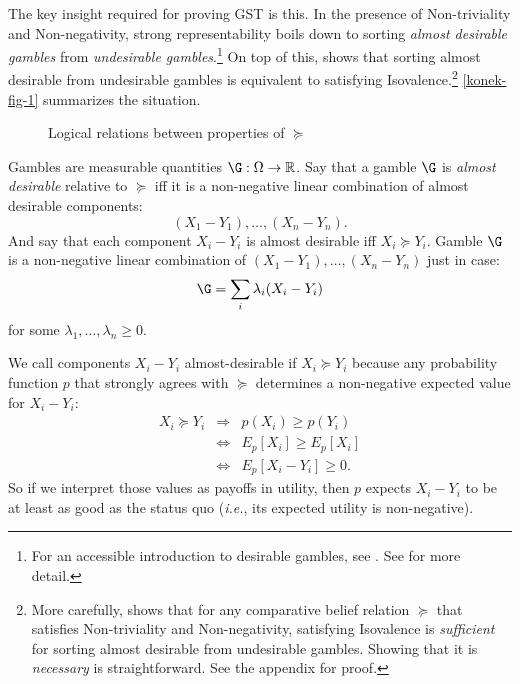 The key insight required for proving GST is this. In the presence of Non-triviality and Non-negativity, strong representability boils down to sorting \textit{almost desirable gambles} from \textit{undesirable gambles}.\footnote{For an accessible introduction to desirable gambles, see \citet{Walley2000}. See \citet{Quaeghebeur2014} for more detail.} On top of this, \citet{Scott1964} shows that sorting almost desirable from undesirable gambles is equivalent to satisfying Isovalence.\footnote{More carefully, \citet{Scott1964} shows that for any comparative belief relation $\succeq$ that satisfies Non-triviality and Non-negativity, satisfying Isovalence is \textit{sufficient} for sorting almost desirable from undesirable gambles. Showing that it is \textit{necessary} is straightforward. See the appendix for proof.} \autoref{konek-fig-1} summarizes the situation.
\begin{figure}[ht]
\centering
\vspace*{3mm}
\caption{Logical relations between properties of $\succeq$}\label{konek-fig-1}
\end{figure}

Gambles are measurable quantities $\G:\Omega\rightarrow\mathbb{R}$. Say that a gamble $\G$ is \textit{almost desirable} relative to $\succeq$ iff it is a non-negative linear combination of almost desirable components:
$$ (X_1-Y_1),\hdots,(X_n-Y_n). $$
And say that each component $X_i-Y_i$ is almost desirable iff $X_i\succeq Y_i$. Gamble $\G$ is a non-negative linear combination of $(X_1-Y_1),\hdots,(X_n-Y_n)$ just in case:
$$ \G=\sum_i \lambda_i(X_i-Y_i) $$
for some $\lambda_1,\hdots,\lambda_n\geq0$.

We call components $X_i-Y_i$ almost-desirable if $X_i\succeq Y_i$ because any probability function $p$ that strongly agrees with $\succeq$ determines a non-negative expected value for $X_i-Y_i$:
\begin{eqnarray*}
X_i\succeq Y_i & \Rightarrow & p(X_i)\geq p(Y_i)\\
& \Leftrightarrow & E_p[X_i]\geq E_p[X_i]\\
& \Leftrightarrow & E_p[X_i-Y_i]\geq 0.
\end{eqnarray*}
So if we interpret those values as payoffs in utility, then $p$ expects $X_i-Y_i$ to be at least as good as the status quo (\textit{i.e.}, its expected utility is non-negative).

